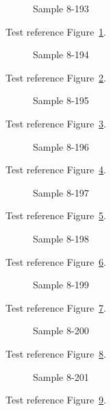 \begin{figure}[tbhp]
\caption{Sample 8-193}
\label{fig:sample-8-193}
\end{figure}

Test reference Figure~\ref{fig:sample-8-193}.

\begin{figure}[tbhp]
\caption{Sample 8-194}
\label{fig:sample-8-194}
\end{figure}

Test reference Figure~\ref{fig:sample-8-194}.

\begin{figure}[tbhp]
\caption{Sample 8-195}
\label{fig:sample-8-195}
\end{figure}

Test reference Figure~\ref{fig:sample-8-195}.

\begin{figure}[tbhp]
\caption{Sample 8-196}
\label{fig:sample-8-196}
\end{figure}

Test reference Figure~\ref{fig:sample-8-196}.

\begin{figure}[tbhp]
\caption{Sample 8-197}
\label{fig:sample-8-197}
\end{figure}

Test reference Figure~\ref{fig:sample-8-197}.

\begin{figure}[tbhp]
\caption{Sample 8-198}
\label{fig:sample-8-198}
\end{figure}

Test reference Figure~\ref{fig:sample-8-198}.

\begin{figure}[tbhp]
\caption{Sample 8-199}
\label{fig:sample-8-199}
\end{figure}

Test reference Figure~\ref{fig:sample-8-199}.

\begin{figure}[tbhp]
\caption{Sample 8-200}
\label{fig:sample-8-200}
\end{figure}

Test reference Figure~\ref{fig:sample-8-200}.

\begin{figure}[tbhp]
\caption{Sample 8-201}
\label{fig:sample-8-201}
\end{figure}

Test reference Figure~\ref{fig:sample-8-201}.

